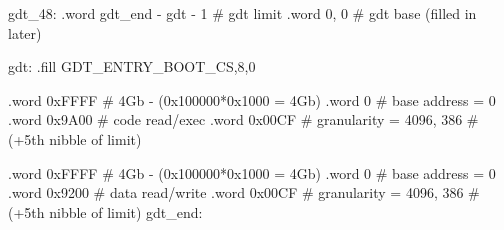 \documentclass[varwidth=29em,crop]{standalone}
\begin{document}
\begin{gascode}
gdt_48:
     .word gdt_end - gdt - 1 # gdt limit
     .word 0, 0              # gdt base (filled in later)

gdt:
     .fill GDT_ENTRY_BOOT_CS,8,0

     .word 0xFFFF # 4Gb - (0x100000*0x1000 = 4Gb)
     .word 0      # base address = 0
     .word 0x9A00 # code read/exec
     .word 0x00CF # granularity = 4096, 386
                  # (+5th nibble of limit)

     .word 0xFFFF # 4Gb - (0x100000*0x1000 = 4Gb)
     .word 0      # base address = 0
     .word 0x9200 # data read/write
     .word 0x00CF # granularity = 4096, 386
                  # (+5th nibble of limit)
gdt_end:
\end{gascode}
\end{document}
